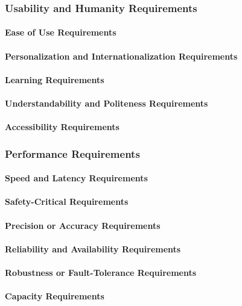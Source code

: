 \documentclass[12pt]{article}
\begin{document}
\subsubsection{Usability and Humanity Requirements}
\paragraph{Ease of Use Requirements}
\paragraph{Personalization and Internationalization Requirements}
\paragraph{Learning Requirements}
\paragraph{Understandability and Politeness Requirements}
\paragraph{Accessibility Requirements}


\subsubsection{Performance Requirements}
\paragraph{Speed and Latency Requirements}
\paragraph{Safety-Critical Requirements}
\paragraph{Precision or Accuracy Requirements}
\paragraph{Reliability and Availability Requirements}
\paragraph{Robustness or Fault-Tolerance Requirements}
\paragraph{Capacity Requirements}
\end{document}
